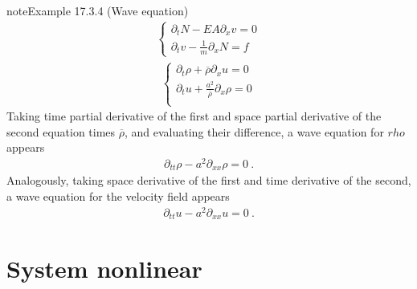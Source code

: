 \documentclass[letterpaper,10pt,english]{jupyterBook}
\begin{document}
\begin{sphinxadmonition}{note}{Example 17.3.4 (Wave equation)}
\begin{equation*}
\begin{split}
\begin{cases}
  \partial_t N - EA \partial_x v = 0 \\
  \partial_t v - \frac{1}{m}\partial_x N = f
\end{cases}\end{split}
\end{equation*}
\sphinxAtStartPar
{}
\begin{equation*}
\begin{split}\begin{cases}
  \partial_t \rho + \overline{\rho} \partial_x u = 0 \\
  \partial_t u    + \frac{a^2}{\overline{\rho}} \partial_x \rho = 0 \\
\end{cases}\end{split}
\end{equation*}
\sphinxAtStartPar
Taking time partial derivative of the first and space partial derivative of the second equation times \(\overline{\rho}\), and evaluating their difference, a wave equation for \(rho\) appears
\begin{equation*}
\begin{split}\partial_{tt} \rho - a^2 \partial_{xx} \rho = 0 \ .\end{split}
\end{equation*}
\sphinxAtStartPar
Analogously, taking space derivative of the first and time derivative of the second, a wave equation for the velocity field appears
\begin{equation*}
\begin{split}\partial_{tt} u - a^2 \partial_{xx} u = 0 \ .\end{split}
\end{equation*}\end{sphinxadmonition}


\section{System non\sphinxhyphen{}linear}
\label{\detokenize{ch/pde/hyperbolic:system-non-linear}}\label{\detokenize{ch/pde/hyperbolic:pde-hyperbolic-system-non-linear}}
\end{document}

